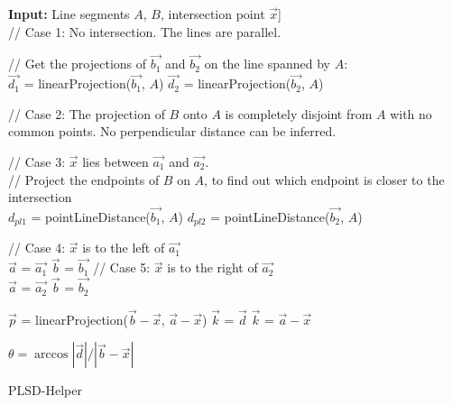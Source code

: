 \documentclass{kththesis}
\begin{document}
\begin{algorithm}[H]
\SetAlgoLined
    \textbf{Input:} Line segments $A$, $B$, intersection point $\vec{x}$]\\
    // Case 1: No intersection. The lines are parallel.\\
     {
        \;
    }

    // Get the projections of $\vec{b_1}$ and $\vec{b_2}$ on the line spanned by $A$:\\
    $\vec{d_1}$ = linearProjection($\vec{b_1}$, $A$)\;
    $\vec{d_2}$ = linearProjection($\vec{b_2}$, $A$)\;

    // Case 2: The projection of $B$ onto $A$ is completely disjoint from $A$ with no common points. No perpendicular distance can be inferred.\\
     {
        \;
    }

    // Case 3: $\vec{x}$ lies between $\vec{a_1}$ and $\vec{a_2}$.\\
     {
        // Project the endpoints of $B$ on $A$, to find out which endpoint is closer to the intersection\\
        $d_{pl1}$ = pointLineDistance($\vec{b_1}$, $A$)\;
        $d_{pl2}$ = pointLineDistance($\vec{b_2}$, $A$)\;
         {
            \;
        } {
            \;
        }
    }

     {
        // Case 4: $\vec{x}$ is to the left of $\vec{a_1}$\\
        $\vec{a}$ = $\vec{a_1}$\;
        $\vec{b}$ = $\vec{b_1}$\;
    } {
        // Case 5: $\vec{x}$ is to the right of $\vec{a_2}$\\
        $\vec{a}$ = $\vec{a_2}$\;
        $\vec{b}$ = $\vec{b_2}$\;
    }

    $\vec{p}$ = linearProjection($\vec{b}-\vec{x}$, $\vec{a}-\vec{x}$)\;
     {
        $\vec{k}$ = $\vec{d}$\;
    } {
        $\vec{k}$ = $\vec{a}-\vec{x}$\;
    }

    $\theta = \arccos{|\vec{d}|/|\vec{b}-\vec{x}|}$\;
    \;

    \caption{PLSD-Helper}
\end{algorithm}
\end{document}
